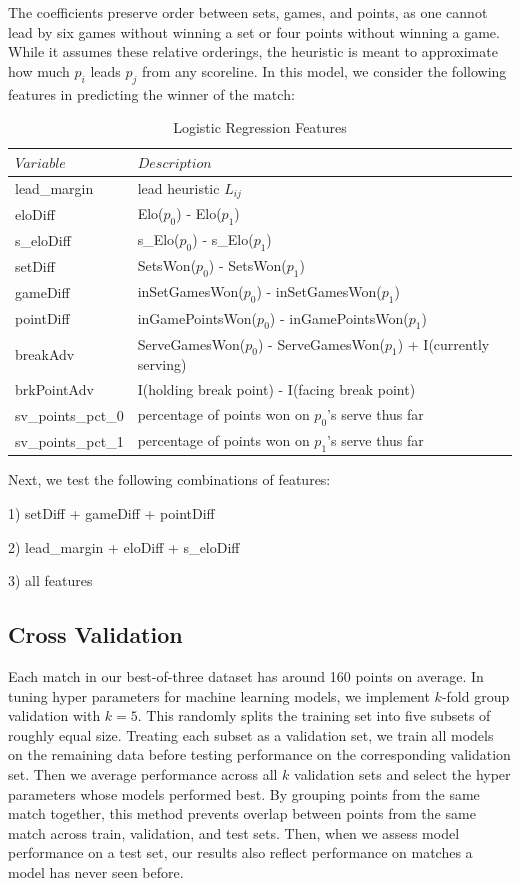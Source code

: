 \documentclass[chapterprefix=false]{report}
\begin{document}
The coefficients preserve order between sets, games, and points, as one cannot lead by six games without winning a set or four points without winning a game. While it assumes these relative orderings, the heuristic is meant to approximate how much $p_i$ leads $p_j$ from any scoreline. In this model, we consider the following features in predicting the winner of the match:

\begin{table}[H]
\centering
\caption{Logistic Regression Features}
\label{my-label}
\begin{tabular}{ll}
 \hline
 $Variable$ & $Description$ \\
 \hline
 lead\_margin & lead heuristic $L_{ij}$ \\
 \hline
 eloDiff &  Elo($p_0$) - Elo($p_1$) \\
 \hline
  s\_eloDiff &  s\_Elo($p_0$) - s\_Elo($p_1$) \\
 \hline
 setDiff &  SetsWon($p_0$) - SetsWon($p_1$)\\
 \hline
 gameDiff &  inSetGamesWon($p_0$) - inSetGamesWon($p_1$)\\
 \hline
 pointDiff &  inGamePointsWon($p_0$) - inGamePointsWon($p_1$)\\
 \hline
  breakAdv &  ServeGamesWon($p_0$) - ServeGamesWon($p_1$) + I(currently serving)\\
 \hline
 brkPointAdv & I(holding break point) - I(facing break point)\\
 \hline
 sv\_points\_pct\_0 & percentage of points won on $p_0$'s serve thus far\\
 \hline
 sv\_points\_pct\_1 & percentage of points won on $p_1$'s serve thus far\\
 \hline
\end{tabular}
\end{table}

Next, we test the following combinations of features:

1) setDiff + gameDiff + pointDiff

2) lead\_margin + eloDiff + s\_eloDiff

3) all features

\subsection{Cross Validation}

Each match in our best-of-three dataset has around 160 points on average. In tuning hyper parameters for machine learning models, we implement $k$-fold group validation with $k=5$. This randomly splits the training set into five subsets of roughly equal size. Treating each subset as a validation set, we train all models on the remaining data before testing performance on the corresponding validation set. Then we average performance across all $k$ validation sets and select the hyper parameters whose models performed best. By grouping points from the same match together, this method prevents overlap between points from the same match across train, validation, and test sets. Then, when we assess model performance on a test set, our results also reflect performance on matches a model has never seen before. 
\end{document}
